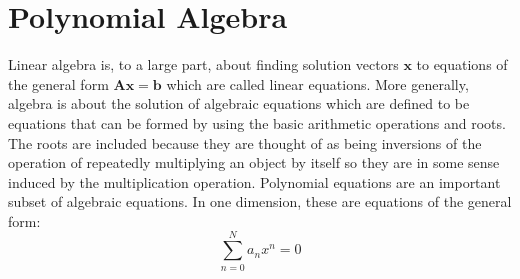 \section{Polynomial Algebra}
Linear algebra is, to a large part, about finding solution vectors $\mathbf{x}$ to equations of the general form $\mathbf{A x} = \mathbf{b}$ which are called linear equations. More generally, algebra is about the solution of algebraic equations which are defined to be equations that can be formed by using the basic arithmetic operations and roots. The roots are included because they are thought of as being inversions of the operation of repeatedly multiplying an object by itself so they are in some sense induced by the multiplication operation. Polynomial equations are an important subset of algebraic equations. In one dimension, these are equations of the general form:
\begin{equation}
 \sum_{n=0}^N a_n x^n = 0
\end{equation}
